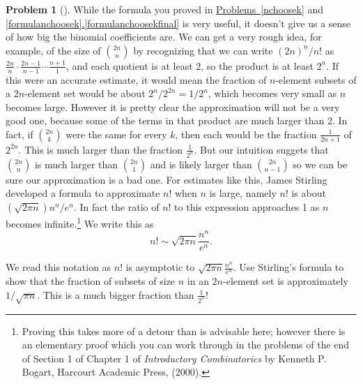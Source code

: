 \documentclass[10pt,]{book}
\theoremstyle{plain}
\theoremstyle{definition}
\newtheorem{activity}[project]{Problem}
\theoremstyle{definition}
\numberwithin{equation}{chapter}
\newcommand{\importantarrow}{\Rightarrow}
\begin{document}
\begin{activity}[]\marginsymbol[-1em]{\pdftooltip{$\importantarrow$}{especially interesting}} \label{Stirling_sapproximation}
While the formula you proved in \hyperref[nchoosek]{Problems~\ref{nchoosek}} and \hyperref[formulanchoosekfinal]{\ref{formulanchoosek}.\ref{formulanchoosekfinal}} is very useful, it doesn't give us a sense of how big the binomial coefficients are. We can get a very rough idea, for example, of the size of \(\binom{2n}{n}\) by recognizing that we can write \((2n)^{\underline{n}}/n!\) as \(\frac{2n}{n}\cdot
\frac{2n-1}{n-1}\cdots \frac{n+1}{1}\), and each quotient is at least \(2\), so the product is at least \(2^n\). If this were an accurate estimate, it would mean the fraction of \(n\)-element subsets of a \(2n\)-element set would be about         \(2^n/2^{2n}=1/2^n\), which becomes very small as \(n\) becomes large. However it is pretty clear the approximation will not be a very good one, because some of the terms in that product are much larger than 2. In fact, if \(\binom{2n}{k}\) were the same for every \(k\), then each would be the fraction \(\frac{1}{2n+1}\) of \(2^{2n}\). This is much larger than the fraction \(\frac{1}{2^n}\). But our intuition suggets that \(\binom{2n}{n}\) is much larger than \(\binom{2n}{1}\) and is likely larger than \(\binom{2n}{n-1}\) so we can be sure our approximation is a bad one. For estimates like this, James Stirling developed a formula to approximate \(n!\) when \(n\) is large, namely \(n!\) is about \(\left(\sqrt{2\pi
n}\right){n^n/ e^n}\). In fact the ratio of \(n!\) to this expression approaches 1 as \(n\) becomes infinite.\footnote{Proving this takes more of a detour than is advisable here; however there is an elementary proof which you can work through in the problems of the end of Section 1 of Chapter 1 of \emph{Introductory Combinatorics} by Kenneth P. Bogart, Harcourt Academic Press, (2000).\label{fn-2}} We write this as%
\begin{equation*}
n!\sim \sqrt{2\pi
n}\frac{n^n}{e^n}.
\end{equation*}
%
\par
We read this notation as \(n!\) is asymptotic to \(\sqrt{2\pi n}\frac{n^n}{e^n}\). Use Stirling's formula to show that the fraction of subsets of size \(n\) in an \(2n\)-element set is approximately \(1/\sqrt{\pi n}\). This is a much bigger fraction than \(\frac{1}{2^n}\)!%
\end{activity}
\typeout{************************************************}
\typeout{************************************************}
\end{document}
